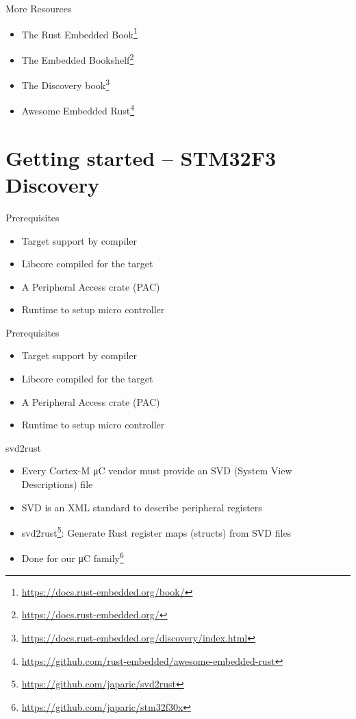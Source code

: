 \documentclass[aspectratio=1610,14pt,t]{beamer}
\begin{document}
\begin{frame}[c]{More Resources}
  \begin{itemize}
    \item The Rust Embedded Book\footnote{\url{https://docs.rust-embedded.org/book/}}
    \item The Embedded Bookshelf\footnote{\url{https://docs.rust-embedded.org/}}
    \item The Discovery book\footnote{\url{https://docs.rust-embedded.org/discovery/index.html}}
    \item Awesome Embedded Rust\footnote{\url{https://github.com/rust-embedded/awesome-embedded-rust}}
  \end{itemize}
\end{frame}

\section{Getting started – STM32F3 Discovery}

\begin{frame}[c]{Prerequisites}
  \begin{itemize}
    \item \Square Target support by compiler
    \item \Square Libcore compiled for the target
    \item \Square A Peripheral Access crate (PAC)
    \item \Square Runtime to setup micro controller
  \end{itemize}
\end{frame}

\begin{frame}[c]{Prerequisites}
  \begin{itemize}
    \item \CheckedBox Target support by compiler
    \item \CheckedBox Libcore compiled for the target
    \item \Square A Peripheral Access crate (PAC)
    \item \Square Runtime to setup micro controller
  \end{itemize}
\end{frame}

\begin{frame}[c]{svd2rust}
  \begin{itemize}
    \item Every Cortex-M μC vendor must provide an SVD (System View
      Descriptions) file
    \item SVD is an XML standard to describe peripheral registers
    \item svd2rust\footnote{\url{https://github.com/japaric/svd2rust}}:
      Generate Rust register maps (structs) from SVD files
    \item Done for our μC family\footnote{\url{https://github.com/japaric/stm32f30x}}
  \end{itemize}
\end{frame}
\end{document}
